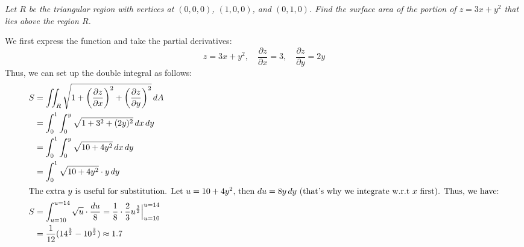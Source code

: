 \documentclass[11pt]{report}
\begin{document}
\begin{example}
    \textit{Let $R$ be the triangular region with vertices at $(0,0,0)$, $(1,0,0)$, and $(0,1,0)$. Find the surface area of the portion of $z = 3x + y^2$ that lies above the region $R$.}
    
    We first express the function and take the partial derivatives:
    $$
        z = 3x + y^2, \quad \frac{\partial z}{\partial x} = 3, \quad \frac{\partial z}{\partial y} = 2y
    $$
    Thus, we can set up the double integral as follows:
    \begin{align*}
        S &= \iint_R \sqrt{1 + \left( \frac{\partial z}{\partial x} \right)^2 + \left( \frac{\partial z}{\partial y} \right)^2} \, dA \\
        &= \int_0^1 \int_0^{y} \sqrt{1 + 3^2 + (2y)^2} \, dx \, dy \\
        &= \int_0^1 \int_0^{y} \sqrt{10 + 4y^2} \, dx \, dy \\
        &= \int_0^1 \sqrt{10 + 4y^2} \cdot y \, dy \\ 
        \intertext{The extra $y$ is useful for substitution. Let $u = 10 + 4y^2$, then $du = 8y \, dy$ (that's why we integrate w.r.t $x$ first). Thus, we have:}
        S &= \int_{u=10}^{u=14} \sqrt{u} \cdot \frac{du}{8} = \frac{1}{8} \cdot \frac{2}{3} u^{\frac{3}{2}} \Big|_{u=10}^{u=14} \\ 
        &= \frac{1}{12} (14^{\frac{3}{2}} - 10^{\frac{3}{2}}) \approx 1.7
    \end{align*}
\end{example}
\end{document}
